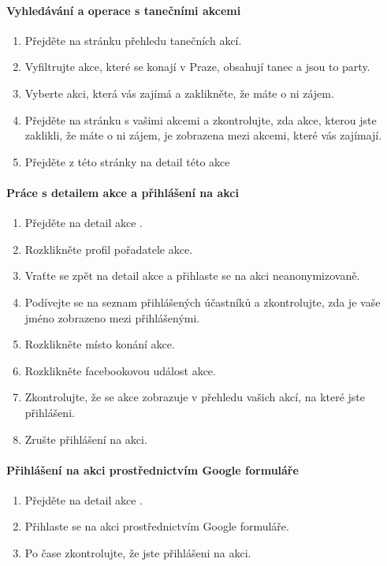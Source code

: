 \paragraph*{Vyhledávání a operace s tanečními akcemi}
\begin{enumerate}
    \item Přejděte na stránku přehledu tanečních akcí.
    \item Vyfiltrujte akce, které se konají v Praze, obsahují tanec  a jsou to party.
    \item Vyberte akci, která vás zajímá a zaklikněte, že máte o ni zájem.
    \item Přejděte na stránku s vašimi akcemi a zkontrolujte, zda akce, kterou jste zaklikli, že máte o ni zájem, je zobrazena mezi akcemi, které vás zajímají.
    \item Přejděte z této stránky na detail této akce
\end{enumerate}

\paragraph*{Práce s detailem akce a přihlášení na akci}
\begin{enumerate}
    \item Přejděte na detail akce .
    \item Rozklikněte profil pořadatele akce.
    \item Vraťte se zpět na detail akce a přihlaste se na akci neanonymizovaně.
    \item Podívejte se na seznam přihlášených účastníků a zkontrolujte, zda je vaše jméno zobrazeno mezi přihlášenými.
    \item Rozklikněte místo konání akce.
    \item Rozklikněte facebookovou událost akce.
    \item Zkontrolujte, že se akce zobrazuje v přehledu vašich akcí, na které jste přihlášeni.
    \item Zrušte přihlášení na akci.
\end{enumerate}

\paragraph*{Přihlášení na akci prostřednictvím Google formuláře}
\begin{enumerate}
    \item Přejděte na detail akce .
    \item Přihlaste se na akci prostřednictvím Google formuláře.
    \item Po čase zkontrolujte, že jste přihlášeni na akci.
\end{enumerate}

